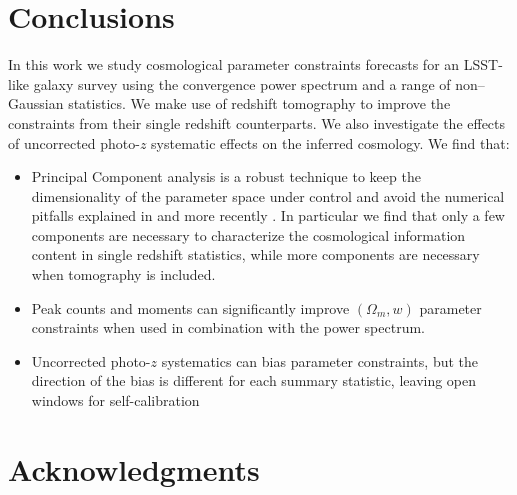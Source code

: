 \documentclass[reprint,aps,prd,superscriptaddress,showkeys,showpacs]{revtex4-1}
\begin{document}
\section{Conclusions}
In this work we study cosmological parameter constraints forecasts for an LSST-like galaxy survey using the convergence power spectrum and a range of non--Gaussian statistics. We make use of redshift tomography to improve the constraints from their single redshift counterparts. We also investigate the effects of uncorrected photo-$z$ systematic effects on the inferred cosmology. We find that:
\begin{itemize}
	\item Principal Component analysis is a robust technique to keep the dimensionality of the parameter space under control and avoid the numerical pitfalls explained in \citep{Taylor12,DodelsonSchneider13,Taylor14} and more recently \citep{PetriVariance}. In particular we find that only a few components are necessary to characterize the cosmological information content in single redshift statistics, while more components are necessary when tomography is included. 
	\item Peak counts and moments can significantly improve $(\Omega_m,w)$ parameter constraints when used in combination with the power spectrum.
	\item Uncorrected photo-$z$ systematics can bias parameter constraints, but the direction of the bias is different for each summary statistic, leaving open windows for self-calibration
\end{itemize}


\section*{Acknowledgments}




\label{lastpage}
\end{document}
